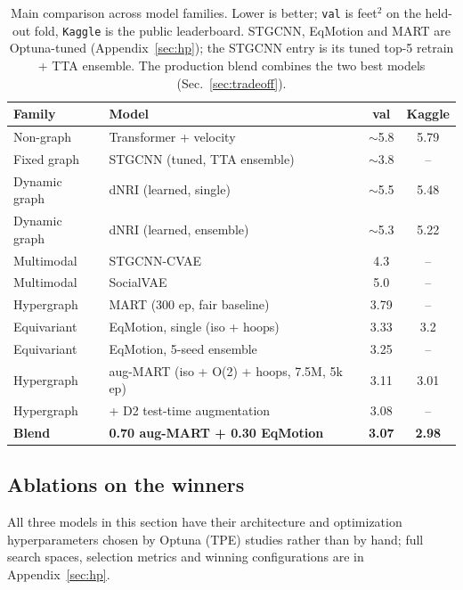 \documentclass{article} %
\begin{document}
\begin{table}[t]
\caption{Main comparison across model families. Lower is better; \texttt{val}
is feet$^2$ on the held-out fold, \texttt{Kaggle} is the public leaderboard.
STGCNN, EqMotion and MART are Optuna-tuned (Appendix~\ref{sec:hp}); the STGCNN
entry is its tuned top-5 retrain + TTA ensemble. The production blend combines
the two best models (Sec.~\ref{sec:tradeoff}).}
\label{tab:main}
\begin{center}
\begin{tabular}{llcc}
\toprule
\textbf{Family} & \textbf{Model} & \textbf{val} & \textbf{Kaggle} \\
\midrule
Non-graph        & Transformer + velocity            & $\sim$5.8 & 5.79 \\
Fixed graph      & STGCNN (tuned, TTA ensemble)      & $\sim$3.8 & -- \\
Dynamic graph    & dNRI (learned, single)            & $\sim$5.5 & 5.48 \\
Dynamic graph    & dNRI (learned, ensemble)          & $\sim$5.3 & 5.22 \\
Multimodal       & STGCNN-CVAE                       & 4.3       & -- \\
Multimodal       & SocialVAE                         & 5.0       & -- \\
Hypergraph       & MART (300 ep, fair baseline)      & 3.79      & -- \\
Equivariant      & EqMotion, single (iso + hoops)    & 3.33      & 3.2 \\
Equivariant      & EqMotion, 5-seed ensemble         & 3.25      & -- \\
Hypergraph       & aug-MART (iso + O(2) + hoops, 7.5M, 5k ep) & 3.11 & 3.01 \\
Hypergraph       & \quad + D2 test-time augmentation & 3.08      & -- \\
\midrule
\textbf{Blend}   & \textbf{0.70 aug-MART + 0.30 EqMotion} & \textbf{3.07} & \textbf{2.98} \\
\bottomrule
\end{tabular}
\end{center}
\end{table}

\subsection{Ablations on the winners}
\label{sec:ablations}
All three models in this section have their
architecture and optimization hyperparameters chosen by Optuna (TPE) studies
rather than by hand; full search spaces, selection metrics and winning
configurations are in Appendix~\ref{sec:hp}.
\end{document}
